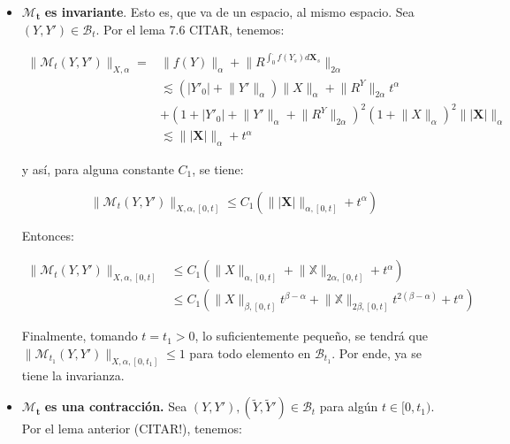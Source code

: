 \begin{itemize}
	\item $\mathbf{ \mathcal{M}_t }$ \textbf{es invariante}. Esto es, que va de un espacio, al mismo espacio. Sea $(Y, Y') \in \mathcal{B}_t$. Por el lema 7.6 CITAR, tenemos:

	\begin{align*}
		\lVert \mathcal{M}_t (Y, Y') \rVert_{X, \alpha} =& \lVert f(Y) \rVert_{\alpha} + \lVert R^{\int_0^{\cdot} f(Y_s) d\mathbf{X}_s }  \rVert_{2\alpha} \\
		&\lesssim ( \lvert Y'_0 \rvert + \lVert Y' \rVert_{\alpha}  )\lVert X \rVert_{\alpha} + \lVert R^Y \rVert_{2\alpha} t^{\alpha} \\
		&+ (1 + \lvert Y'_0 \rvert + \lVert Y' \rVert_{\alpha} + 
		 \lVert  R^Y \rVert_{2\alpha})^{2} (1 + \lVert X \rVert_{\alpha})^2 \lVert \lvert \mathbf{X} \rvert \rVert_{\alpha} \\
		&\lesssim  \lVert \lvert \mathbf{X} \rvert \rVert_{\alpha} + t^{\alpha}
	\end{align*}

	y así, para alguna constante $C_1$, se tiene:

	\[
		\lVert \mathcal{M}_t (Y,Y') \rVert_{ X, \alpha, [0,t] } \leq C_1 \left(  \lVert  \lvert \mathbf{X} \rvert  \rVert_{\alpha, [0,t]} + t^{\alpha} \right)
	\]

	Entonces:

	\begin{align*}
		\lVert \mathcal{M}_t (Y,Y') \rVert_{X, \alpha, [0,t]} &\leq  C_1 ( \lVert X \rVert_{\alpha, [0,t]} + \lVert \mathbb{X} \rVert_{2\alpha, [0,t]} + t^{\alpha} ) \\
		&\leq C_1 ( \lVert X \rVert_{\beta, [0,t]} t^{\beta - \alpha} + \lVert \mathbb{X} \rVert_{2 \beta, [0,t]} t^{2 (\beta - \alpha)} + t^{\alpha} )
	\end{align*}

	Finalmente, tomando $t = t_1 > 0$, lo suficientemente pequeño, se tendrá que $\lVert \mathcal{M}_{t_1} (Y, Y') \rVert_{X, \alpha, [0, t_1]} \leq 1$ para todo elemento en $\mathcal{B}_{t_1}$. Por ende, ya se tiene la invarianza.


	\item $\mathbf{\mathcal{M}_t}$ \textbf{es una contracción.} Sea $(Y, Y'), ( \tilde{Y}, \tilde{Y}' ) \in \mathcal{B}_{t}$ para algún $t \in [0,t_1)$. Por el lema anterior (CITAR!), tenemos:

	\begin{comment}
	\begin{align*}
		\lVert  \mathcal{M}_t (Y, Y') - \mathcal{M}_t (\tilde{Y}, \tilde{Y}') \rVert_{X, \alpha} &=  \lVert f(Y) - f(\tilde{Y}) \rVert_{\alpha} + \lVert R^{\int_0^{\cdot} f(Y_s) d\mathbf{X}_s} - R^{\int_0^{\cdot} f( \tilde{Y}_s ) d \mathbf{ \tilde{X} }_s }  \rVert_{2 \alpha} \\
		&\lesssim ( \lVert Y' - \tilde{Y}' \rVert_{\alpha} + \lVert R^Y - R^{\tilde{Y}} \rVert_{2\alpha} )( \lVert \lvert \mathbf{X} \rvert \rVert_{\alpha} + t^{\alpha}  ) 
	\end{align*}
	\end{comment}


\end{itemize}
